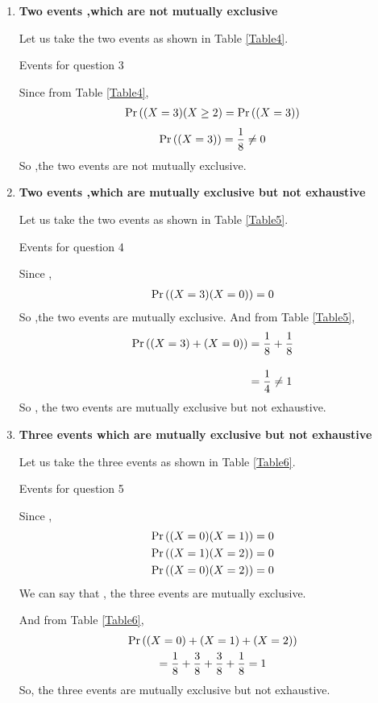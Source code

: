 \documentclass[journal,12pt,twocolumn]{IEEEtran}
\begin{document}
\begin{enumerate}[label=(\roman*)]
    \item \textbf{Two events ,which are not mutually exclusive}
    
    Let us take the two events as shown in Table \ref{Table4}.
    \begin{table}[ht!]
    \def\arraystretch{1.75}
        
        \caption{Events for question 3}
        \label{Table4}
    \end{table}
    Since from Table \ref{Table4},
    \begin{align}
        \Pr\left((X=3)(X \ge 2\right) = \Pr\left((X=3)\right) 
    \end{align}
    \begin{align}
        \Pr\left((X=3)\right) = \dfrac{1}{8} \neq 0
    \end{align}
    So ,the two events are not mutually exclusive.
  
    \item \textbf{Two events ,which are mutually exclusive but not exhaustive}
    
    Let us take the two events as shown in Table \ref{Table5}.
    \begin{table}[ht!]
    \def\arraystretch{1.75}
        
        \caption{Events for question 4}
        \label{Table5}
    \end{table}
    Since ,
    \begin{align}
        \Pr\left((X=3)(X=0)\right) = 0
    \end{align}
    So ,the two events are mutually exclusive. And from Table \ref{Table5},
    \begin{align}
        \Pr\left((X=3) + (X=0)\right) &= \dfrac{1}{8} + \dfrac{1}{8}\\[10pt]
                      &= \dfrac{1}{4} \neq 1
    \end{align}
    So , the two events are mutually exclusive but not exhaustive.
    
    \item \textbf{Three events which are mutually exclusive but not exhaustive}
    
    Let us take the three events as shown in Table \ref{Table6}.
    \begin{table}[ht!]
    \def\arraystretch{1.75}
        
        \caption{Events for question 5}
        \label{Table6}
    \end{table}
    Since , 
    \begin{align}
        \Pr\left((X=0)(X=1)\right) &= 0 \\
        \Pr\left((X=1)(X=2)\right) &= 0 \\
        \Pr\left((X=0)(X=2)\right) &= 0
    \end{align}
    We can say that , the three events are mutually exclusive.
    
    And from Table \ref{Table6},
    \begin{multline}
        \Pr\left((X=0) + (X=1) + (X=2)\right)  \\ =
        \dfrac{1}{8}+\dfrac{3}{8}+\dfrac{3}{8}+\dfrac{1}{8} = 1 
    \end{multline}
    So, the three events are mutually exclusive but not exhaustive.
    
\end{enumerate}
\end{document}
